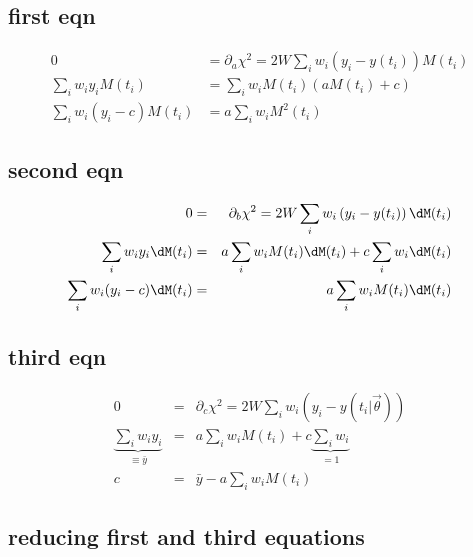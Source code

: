 \subsection{first eqn}
\begin{align}
0                                    &= \partial_{a} \chi^2 = 2W\sum_i w_i \left(y_i - y(t_i)\right)M(t_i)\\
\sum_i w_i y_i M(t_i)                &= \sum_i w_i M(t_i) \left(aM(t_i) + c\right)\\
\sum_iw_i(y_i - c)M(t_i) &= a\sum_i w_iM^2(t_i)%
\end{align}

\subsection{second eqn}

\begin{eqnarray}
0 &=& \partial_{b} \chi^2 = 2W\sum_i w_i \left(y_i - y(t_i)\right)\dM(t_i)\\
\sum_i w_i y_i \dM(t_i) &=& a\sum_i w_iM(t_i)\dM(t_i) + c\sum_i w_i\dM(t_i)\\
\sum_i w_i (y_i - c)\dM(t_i) &=& a\sum_iw_i M(t_i)\dM(t_i)
\end{eqnarray}


\subsection{third eqn}

\begin{eqnarray}
0 &=& \partial_{c} \chi^2 = 2W\sum_i w_i \left(y_i - y(t_i | \vec{\theta})\right)\\
\underbrace{\sum_i w_i y_i}_{\equiv\bar{y}} &=& a\sum_i w_i M(t_i) + c\underbrace{\sum_i w_i}_{=1}\\
c &=& \bar{y} - a\sum_i w_i M(t_i)
\end{eqnarray}

\subsection{reducing first and third equations}


